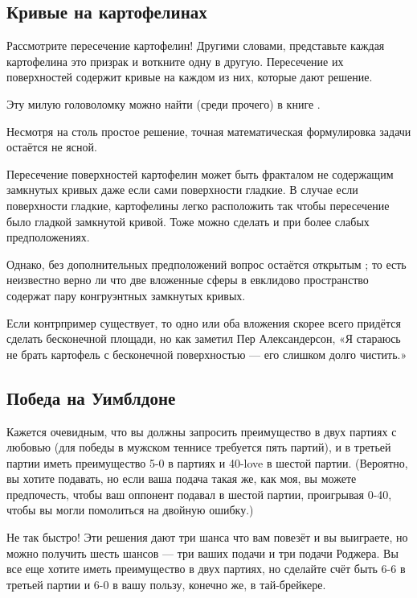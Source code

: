 \subsection*{Кривые на картофелинах}

Рассмотрите пересечение картофелин!
Другими словами, представьте каждая картофелина это призрак и воткните одну в другую.
Пересечение их поверхностей содержит кривые на каждом из них, которые дают решение.

Эту милую головоломку можно найти (среди прочего) в книге \cite{berlekamp-rodgers}.

\begin{addedbytheeditors}
Несмотря на столь простое решение, точная математическая формулировка задачи остаётся не ясной.

Пересечение поверхностей картофелин может быть фракталом не содержащим замкнутых кривых даже если сами поверхности гладкие.
В случае если поверхности гладкие, картофелины легко расположить так чтобы пересечение было гладкой замкнутой кривой.
Тоже можно сделать и при более слабых предположениях.

Однако, без дополнительных предположений вопрос остаётся открытым \cite{agol};
то есть неизвестно верно ли что две вложенные сферы в евклидово пространство содержат пару конгруэнтных замкнутых кривых. 

Если контрпример существует, то одно или оба вложения скорее всего придётся сделать бесконечной площади,
но как заметил Пер Александерсон,
«Я стараюсь не брать картофель с бесконечной поверхностью --- его слишком долго чистить.»
\end{addedbytheeditors}

\subsection*{Победа на Уимблдоне}

Кажется очевидным, что вы должны запросить преимущество в двух партиях с любовью (для победы в мужском теннисе требуется пять партий), и в третьей партии иметь преимущество 5-0 в партиях и 40-love в шестой партии. (Вероятно, вы хотите подавать, но если ваша подача такая же, как моя, вы можете предпочесть, чтобы ваш оппонент подавал в шестой партии, проигрывая 0-40, чтобы вы могли помолиться на двойную ошибку.)

Не так быстро!
Эти решения дают три шанса что вам повезёт и вы выиграете, но можно получить шесть шансов --- три ваших подачи и три подачи Роджера.
Вы все еще хотите иметь преимущество в двух партиях, но сделайте счёт быть 6-6 в третьей партии и 6-0 в вашу пользу, конечно же, в тай-брейкере.

